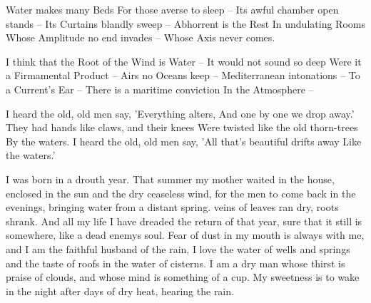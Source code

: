 \documentclass[12pt, letterpaper]{report}
\begin{document}
\author{Emily Dickinson}

\begin{poem}
\begin{stanza}
Water makes many Beds\verseline
For those averse to sleep --\verseline
Its awful chamber open stands --\verseline
Its Curtains blandly sweep --\verseline
Abhorrent is the Rest\verseline
In undulating Rooms\verseline
Whose Amplitude no end invades --\verseline
Whose Axis never comes.
\end{stanza}
\end{poem}

\author{by Emily Dickinson}

\begin{poem}
\begin{stanza}
I think that the Root of the Wind is Water --\verseline
It would not sound so deep\verseline
Were it a Firmamental Product --\verseline
Airs no Oceans keep --\verseline
Mediterranean intonations --\verseline
To a Current's Ear --\verseline
There is a maritime conviction\verseline
In the Atmosphere --
\end{stanza}
\end{poem}

\clearpage

\author{William Butler Yeats}

\begin{poem}
\begin{stanza}
I heard the old, old men say,\verseline
'Everything alters,\verseline
And one by one we drop away.'\verseline
They had hands like claws, and their knees\verseline
Were twisted like the old thorn-trees\verseline
By the waters.\verseline
I heard the old, old men say,\verseline
'All that's beautiful drifts away\verseline
Like the waters.'
\end{stanza}
\end{poem}

\author{Wendell Berry}

\begin{poem}
\begin{stanza}
I was born in a drouth year. That summer\verseline
my mother waited in the house, enclosed\verseline
in the sun and the dry ceaseless wind,\verseline
for the men to come back in the evenings,\verseline
bringing water from a distant spring.\verseline
veins of leaves ran dry, roots shrank.\verseline
And all my life I have dreaded the return\verseline
of that year, sure that it still is\verseline
somewhere, like a dead enemys soul.\verseline
Fear of dust in my mouth is always with me,\verseline
and I am the faithful husband of the rain,\verseline
I love the water of wells and springs\verseline
and the taste of roofs in the water of cisterns.\verseline
I am a dry man whose thirst is praise\verseline
of clouds, and whose mind is something of a cup.\verseline
My sweetness is to wake in the night\verseline
after days of dry heat, hearing the rain.
\end{stanza}
\end{poem}
\end{document}
